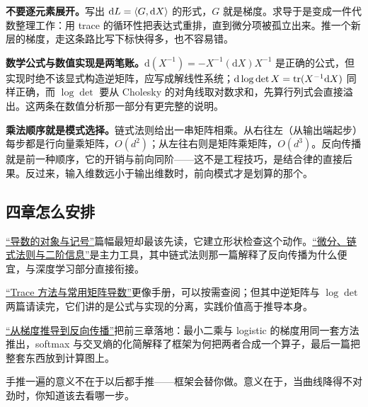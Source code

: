 \textbf{不要逐元素展开。}写出 \(\mathrm dL=\left\langle G,\mathrm dX\right\rangle\) 的形式，\(G\) 就是梯度。求导于是变成一件代数整理工作：用 trace 的循环性把表达式重排，直到微分项被孤立出来。推一个新层的梯度，走这条路比写下标快得多，也不容易错。

\textbf{数学公式与数值实现是两笔账。}\(\mathrm d(X^{-1})=-X^{-1}(\mathrm dX)X^{-1}\) 是正确的公式，但实现时绝不该显式构造逆矩阵，应写成解线性系统；\(\mathrm d\log\det X=\operatorname{tr}(X^{-1}\mathrm dX)\) 同样正确，而 \(\log\det\) 要从 Cholesky 的对角线取对数求和，先算行列式会直接溢出。这两条在数值分析那一部分有更完整的说明。

\textbf{乘法顺序就是模式选择。}链式法则给出一串矩阵相乘。从右往左（从输出端起步）每步都是行向量乘矩阵，\(O(d^2)\)；从左往右则是矩阵乘矩阵，\(O(d^3)\)。反向传播就是前一种顺序，它的开销与前向同阶——这不是工程技巧，是结合律的直接后果。反过来，输入维数远小于输出维数时，前向模式才是划算的那个。

\subsection{四章怎么安排}

\hyperref[ch:081]{``导数的对象与记号''}篇幅最短却最该先读，它建立形状检查这个动作。\hyperref[ch:082]{``微分、链式法则与二阶信息''}是主力工具，其中链式法则那一篇解释了反向传播为什么便宜，与深度学习部分直接衔接。

\hyperref[ch:083]{``Trace 方法与常用矩阵导数''}更像手册，可以按需查阅；但其中逆矩阵与 \(\log\det\) 两篇请读完，它们讲的是公式与实现的分离，实践价值高于推导本身。

\hyperref[ch:084]{``从梯度推导到反向传播''}把前三章落地：最小二乘与 logistic 的梯度用同一套方法推出，softmax 与交叉熵的化简解释了框架为何把两者合成一个算子，最后一篇把整套东西放到计算图上。

手推一遍的意义不在于以后都手推——框架会替你做。意义在于，当曲线降得不对劲时，你知道该去看哪一步。
